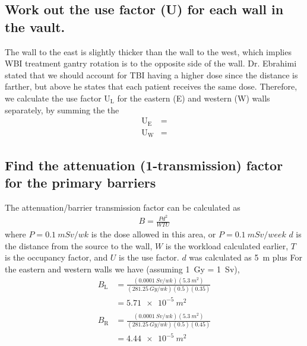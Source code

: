 \documentclass[%
aps,
mph,%
amsmath,amssymb,
preprint,%
tightenlines,
longbibliography,
superscriptaddress,
floatfix,
nofootinbib,
]{revtex4-2}
\begin{document}
    \subsection{Work out the use factor (U) for each wall in the vault.}
    The wall to the east is slightly thicker than the wall to the west, which implies WBI treatment gantry rotation is to the opposite side of the wall. Dr. Ebrahimi stated that we should account for TBI having a higher dose since the distance is farther, but above he states that each patient receives the same dose. Therefore, we calculate the use factor $\mathrm{U_L}$ for the eastern (E) and western (W) walls separately, by summing the the 
    \begin{align*}
        \mathrm{U_E} &= \\
        \mathrm{U_W} &= 
    \end{align*}

    \subsection{Find the attenuation (1-transmission) factor for the primary barriers}
    The attenuation/barrier transmission factor can be calculated as
    \begin{align}
        B = \frac{Pd^2}{WTU}
    \end{align}
    where $P = \qty{0.1}{mSv/wk}$ is the dose allowed in this  area, or $P = \qty{0.1}{mSv/week}$ $d$ is the distance from the source to the wall, $W$ is the workload calculated earlier, $T$ is the occupancy factor, and $U$ is the use factor. $d$ was calculated as \qty{5}{m} plus  For the eastern and western walls we have (assuming \qty{1}{Gy} = \qty{1}{Sv}),
    \begin{align*}
        B_\mathrm{L} &=  \frac{\left( \qty{0.0001}{Sv/wk} \right)\left( \qty{5.3}{m^2} \right)}{\left( \qty{281.25}{Gy/wk} \right)\left( 0.5 \right)\left( 0.35 \right)} \\
        &= \SI{5.71e-5}{m^2} \\ \\ 
        B_\mathrm{R} &=  \frac{\left( \qty{0.0001}{Sv/wk} \right)\left( \qty{5.3}{m^2} \right)}{\left( \qty{281.25}{Gy/wk} \right)\left( 0.5 \right)\left( 0.45 \right)} \\
        &= \SI{4.44e-5}{m^2}       
    \end{align*}
    
    
\end{document}
